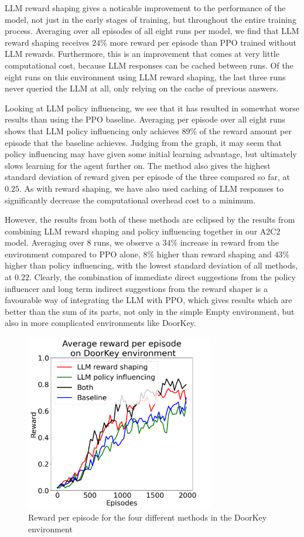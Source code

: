 \documentclass[conference]{IEEEtran}
\begin{document}
LLM reward shaping gives a noticable improvement to the performance of the model, not just in the early stages of training, but throughout the entire training process. Averaging over all episodes of all eight runs per model, we find that LLM reward shaping receives $24\%$ more reward per episode than PPO trained without LLM rewards. Furthermore, this is an improvement that comes at very little computational cost, because LLM responses can be cached between runs. Of the eight runs on this environment using LLM reward shaping, the last three runs never queried the LLM at all, only relying on the cache of previous answers.

Looking at LLM policy influencing, we see that it has resulted in somewhat worse results than using the PPO baseline. Averaging per episode over all eight runs shows that LLM policy influencing only achieves $89\%$ of the reward amount per episode that the baseline achieves. Judging from the graph, it may seem that policy influencing may have given some initial learning advantage, but ultimately slows learning for the agent further on. The method also gives the highest standard deviation of reward given per episode of the three compared so far, at $0.25$. As with reward shaping, we have also used caching of LLM responses to significantly decrease the computational overhead cost to a minimum. 

However, the results from both of these methods are eclipsed by the results from combining LLM reward shaping and policy influencing together in our A2C2 model. Averaging over 8 runs, we observe a $34\%$ increase in reward from the environment compared to PPO alone, $8\%$ higher than reward shaping and $43\%$ higher than policy influencing, with the lowest standard deviation of all methods, at $0.22$. Clearly, the combination of immediate direct suggestions from the policy influencer and long term indirect suggestions from the reward shaper is a favourable way of integrating the LLM with PPO, which gives results which are better than the sum of its parts, not only in the simple Empty environment, but also in more complicated environments like DoorKey.

\begin{figure}[h]
\centerline{\includegraphics[width=3.25in]{figure/doorkeyresults.png}}
\caption{Reward per episode for the four different methods in the DoorKey environment}
\label{doorkeyresults}
\end{figure}
\end{document}
